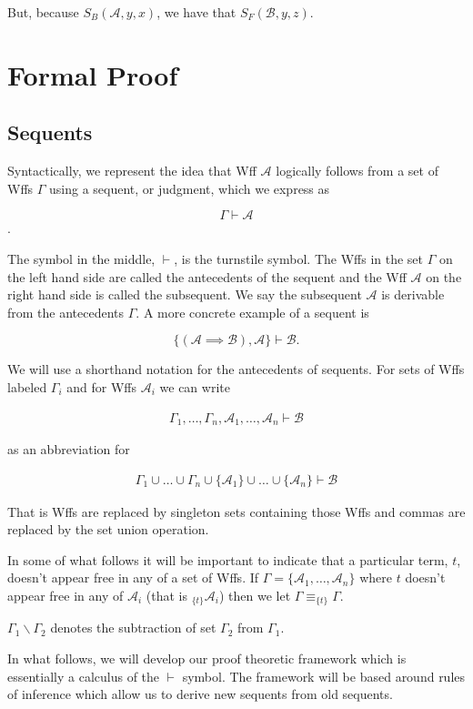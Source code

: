 \documentclass[12pt]{article}
\newcommand{\mc}[1]{\mathcal{#1}}
\begin{document}
But, because $S_B(\mc{A}, y, x)$, we have that $S_F(\mc{B}, y, z)$.


\newpage

\section{Formal Proof}
\subsection{Sequents}
Syntactically, we represent the idea that Wff $\mc{A}$ logically follows from a set of Wffs $\Gamma$ using a sequent, or judgment, which we express as

$$\Gamma \vdash \mc{A}$$.

The symbol in the middle, $\vdash$, is the turnstile symbol.
The Wffs in the set $\Gamma$ on the left hand side are called the antecedents of the sequent and the Wff $\mc{A}$ on the right hand side is called the subsequent.
We say the subsequent $\mc{A}$ is derivable from the antecedents $\Gamma$.
A more concrete example of a sequent is 

$$
\{(\mc{A}\implies \mc{B}), \mc{A}\} \vdash \mc{B}.
$$

We will use a shorthand notation for the antecedents of sequents.
For sets of Wffs labeled $\Gamma_i$ and for Wffs $\mc{A}_i$ we can write

\begin{align}
\Gamma_1, \ldots, \Gamma_n, \mc{A}_1, \ldots, \mc{A}_n \vdash \mc{B}
\end{align}

as an abbreviation for

\begin{align}
\Gamma_1 \cup \ldots \cup \Gamma_n \cup \{\mc{A}_1\} \cup \ldots \cup \{\mc{A}_n\} \vdash \mc{B}
\end{align}

That is Wffs are replaced by singleton sets containing those Wffs and commas are replaced by the set union operation.

In some of what follows it will be important to indicate that a particular term, $t$, doesn't appear free in any of a set of Wffs. If $\Gamma = \{\mc{A}_1, \ldots , \mc{A}_n\}$ where $t$ doesn't appear free in any of $\mc{A}_i$ (that is $_{\{t\}}\mc{A}_i$) then we let $\Gamma \equiv _{\{t\}}\Gamma$.

$\Gamma_1 \backslash \Gamma_2$ denotes the subtraction of set $\Gamma_2$ from $\Gamma_1$.

In what follows, we will develop our proof theoretic framework which is essentially a calculus of the $\vdash$ symbol.
The framework will be based around rules of inference which allow us to derive new sequents from old sequents.
\end{document}
